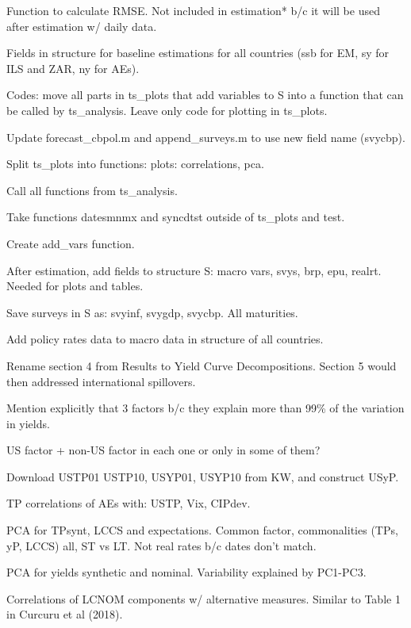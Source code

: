 \documentclass[12pt]{article}
\newcommand{\cmark}{\ding{51}}
\newcommand{\done}{\rlap{$\square$}{\raisebox{2pt}{\large\hspace{1pt}\cmark}}%
	\hspace{-2.5pt}}
\begin{document}
\begin{todolist}
	\item[\done] Function to calculate RMSE. Not included in estimation* b/c it will be used after estimation w/ daily data.
	\item[\done] Fields in structure for baseline estimations for all countries (ssb for EM, sy for ILS and ZAR, ny for AEs).
	\item[\done] Codes: move all parts in ts_plots that add variables to S into a function that can be called by ts_analysis. Leave only code for plotting in ts_plots.
	\begin{todolist}		
		\item[\done] Update forecast_cbpol.m and append_surveys.m to use new field name (svycbp).
		\item[\done] Split ts_plots into functions: plots: correlations, pca.
		\item[\done] Call all functions from ts_analysis.
		\item[\done] Take functions datesmnmx and syncdtst outside of ts_plots and test.
		\item[\done] Create add_vars function.
		\item[\done] After estimation, add fields to structure S: macro vars, svys, brp, epu, realrt. Needed for plots and tables.
		\item[\done] Save surveys in S as: svyinf, svygdp, svycbp. All maturities. 
		\item[\done] Add policy rates data to macro data in structure of all countries.
	\end{todolist}
	\item[\done] Rename section 4 from Results to Yield Curve Decompositions. Section 5 would then addressed international spillovers.
	\item[\done] Mention explicitly that 3 factors b/c they explain more than 99\% of the variation in yields.
	\item[\done] US factor + non-US factor in each one or only in some of them?
	\item[\done] Download USTP01 USTP10, USYP01, USYP10 from KW, and construct USyP.
	\item[\done] TP correlations of AEs with: USTP, Vix, CIPdev.
	\item[\done] PCA for TPsynt, LCCS and expectations. Common factor, commonalities (TPs, yP, LCCS) all, ST vs LT. Not real rates b/c dates don't match.
	\item[\done] PCA for yields synthetic and nominal. Variability explained by PC1-PC3. 
	\item[\done] Correlations of LCNOM components w/ alternative measures. Similar to Table 1 in Curcuru et al (2018).

\end{todolist}
\end{document}
